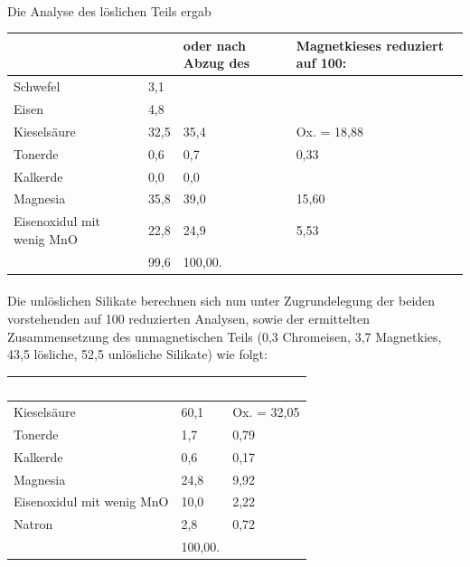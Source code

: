 \documentclass[a4paper, 11pt, oneside, german]{article}
\begin{document}
\paragraph{}
Die Analyse des löslichen Teils ergab
\begin{table}[H]
    \centering
    \begin{tabular}{|l|l|l|l|}
    \hline
        ~ & ~ & oder nach Abzug des & Magnetkieses reduziert auf 100: \\ \hline
        Schwefel & 3,1 & ~ & ~ \\ \hline
        Eisen & 4,8 & ~ & ~ \\ \hline
        Kieselsäure & 32,5 & 35,4 & Ox. = 18,88 \\ \hline
        Tonerde & 0,6 & 0,7 & 0,33 \\ \hline
        Kalkerde & 0,0 & 0,0 & ~ \\ \hline
        Magnesia & 35,8 & 39,0 & 15,60 \\ \hline
        Eisenoxidul mit wenig MnO & 22,8 & 24,9 & 5,53 \\ \hline
        ~ & 99,6 & 100,00. & ~ \\ \hline
    \end{tabular}
\end{table}
\paragraph{}
Die unlöslichen Silikate berechnen sich nun unter Zugrundelegung der beiden vorstehenden auf 100 reduzierten Analysen, sowie der ermittelten Zusammensetzung des unmagnetischen Teils (0,3 Chromeisen, 3,7 Magnetkies, 43,5 lösliche, 52,5 unlösliche Silikate) wie folgt:
\begin{table}[H]
    \centering
    \begin{tabular}{|l|l|l|}
    \hline
        ~ & ~ & ~ \\ \hline
        Kieselsäure & 60,1 & Ox. = 32,05 \\ \hline
        Tonerde & 1,7 & 0,79 \\ \hline
        Kalkerde & 0,6 & 0,17 \\ \hline
        Magnesia & 24,8 & 9,92 \\ \hline
        Eisenoxidul mit wenig MnO & 10,0 & 2,22 \\ \hline
        Natron & 2,8 & 0,72 \\ \hline
        ~ & 100,00. & ~ \\ \hline
    \end{tabular}
\end{table}
\end{document}

